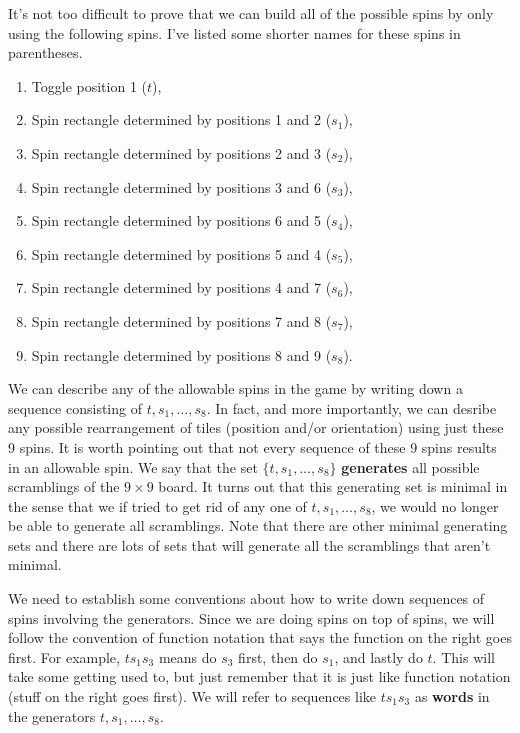 It's not too difficult to prove that we can build all of the possible spins by only using the following spins.  I've listed some shorter names for these spins in parentheses.
\begin{enumerate}
\item Toggle position 1 (\(t\)),
\item Spin rectangle determined by positions 1 and 2 (\(s_1\)),
\item Spin rectangle determined by positions 2 and 3 (\(s_2\)),
\item Spin rectangle determined by positions 3 and 6 (\(s_3\)),
\item Spin rectangle determined by positions 6 and 5 (\(s_4\)),
\item Spin rectangle determined by positions 5 and 4 (\(s_5\)),
\item Spin rectangle determined by positions 4 and 7 (\(s_6\)),
\item Spin rectangle determined by positions 7 and 8 (\(s_7\)),
\item Spin rectangle determined by positions 8 and 9 (\(s_8\)).
\end{enumerate}
We can describe any of the allowable spins in the game by writing down a sequence consisting of \(t,s_1,\ldots, s_8\).  In fact, and more importantly, we can desribe any possible rearrangement of tiles (position and/or orientation) using just these 9 spins.  It is worth pointing out that not every sequence of these 9 spins results in an allowable spin.  We say that the set \(\{t, s_1,\ldots,s_8\}\) \textbf{generates} all possible scramblings of the \(9\times 9\) board.  It turns out that this generating set is minimal in the sense that we if tried to get rid of any one of \(t, s_1, \ldots, s_8\), we would no longer be able to generate all scramblings.  Note that there are other minimal generating sets and there are lots of sets that will generate all the scramblings that aren't minimal.

We need to establish some conventions about how to write down sequences of spins involving the generators.  Since we are doing spins on top of spins, we will follow the convention of function notation that says the function on the right goes first.  For example, \(ts_1 s_3\) means do \(s_3\) first, then do \(s_1\), and lastly do \(t\).  This will take some getting used to, but just remember that it is just like function notation (stuff on the right goes first).  We will refer to sequences like \(ts_1 s_3\) as \textbf{words} in the generators \(t,s_1,\ldots, s_8\).

